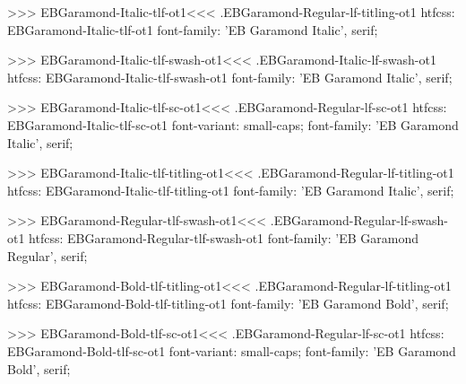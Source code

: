 {{{{{{{>>>
\<EBGaramond-Italic-tlf-ot1\><<<
.EBGaramond-Regular-lf-titling-ot1
htfcss:  EBGaramond-Italic-tlf-ot1  font-family: 'EB Garamond Italic', serif;

>>>
\<EBGaramond-Italic-tlf-swash-ot1\><<<
.EBGaramond-Italic-lf-swash-ot1
htfcss:  EBGaramond-Italic-tlf-swash-ot1  font-family: 'EB Garamond Italic', serif;

>>>
\<EBGaramond-Italic-tlf-sc-ot1\><<<
.EBGaramond-Regular-lf-sc-ot1
htfcss:  EBGaramond-Italic-tlf-sc-ot1  font-variant: small-caps; font-family: 'EB Garamond Italic', serif;

>>>
\<EBGaramond-Italic-tlf-titling-ot1\><<<
.EBGaramond-Regular-lf-titling-ot1
htfcss:  EBGaramond-Italic-tlf-titling-ot1  font-family: 'EB Garamond Italic', serif;

>>>
\<EBGaramond-Regular-tlf-swash-ot1\><<<
.EBGaramond-Regular-lf-swash-ot1
htfcss:  EBGaramond-Regular-tlf-swash-ot1  font-family: 'EB Garamond Regular', serif;

>>>
\<EBGaramond-Bold-tlf-titling-ot1\><<<
.EBGaramond-Regular-lf-titling-ot1
htfcss:  EBGaramond-Bold-tlf-titling-ot1  font-family: 'EB Garamond Bold', serif;

>>>
\<EBGaramond-Bold-tlf-sc-ot1\><<<
.EBGaramond-Regular-lf-sc-ot1
htfcss:  EBGaramond-Bold-tlf-sc-ot1  font-variant: small-caps; font-family: 'EB Garamond Bold', serif;

}}}}}}}
